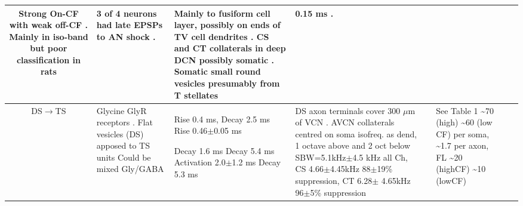 \begin{longtable}{cYYYYYYY}
Strong On-CF with weak off-CF  \citep[See fig 13][]{OstapoffBensonEtAl:1999}. 
Mainly in iso-band but poor classification in rats \citep{DoucetRossEtAl:1999,FriedlandPongstapornEtAl:2003}         
& %
3 of 4 neurons had late EPSPs to AN shock \citep[very young mice][]{ZhangOertel:1993}.
\citep{OstapoffBensonEtAl:1999} 

& %
Mainly to fusiform cell layer, possibly on ends of TV cell dendrites \citep[mouse][]{OertelWuEtAl:1990}. 
CS and CT collaterals in deep DCN possibly somatic \citep[guinea pig][]{PalmerWallaceEtAl:2003}.
Somatic small round vesicles presumably from T stellates  \citep[guinea pig][]{Alibardi:1999}   
& %
0.15 ms \citep[min EPSP latency to VCN Glutamate puffs, main excitation at 0.3 ms, AN shock produces late EPSPs about 3 msec][]{ZhangOertel:1993}.
\\ \midrule
DS\ensuremath{\rightarrow}TS                        
& %
Glycine GlyR receptors \citep[mouse][]{FerragamoGoldingEtAl:1998a}.
Flat vesicles (DS) apposed to TS units \citep[cat][]{SmithRhode:1989}     
Could be mixed Gly/GABA \citep{AltschulerJuizEtAl:1993} 
& %
Rise 0.4 ms, Decay 2.5 ms \citep[spontaneous IPSCs in rat MNTB neurons,][]{AwatramaniTurecekEtAl:2005}
Rise 0.46$\pm$0.05 ms \citep[spontaneous IPSCs in AVCN bushy cells, mouse][]{LimOleskevichEtAl:2003}


Decay 1.6 ms \citep[mouse VCN,]{Oertel:1983}
Decay 5.4 ms \citep{OertelWickesberg:1993,WickesbergOertel:1993}    
Activation 2.0$\pm$1.2 ms Decay 5.3 ms \citep[Gly puffs at 22$^\circ$C (Q$_{10}$ 2.1) in  guinea pig VCN,][]{HartyManis:1998}
& %
DS axon terminals cover 300 $\mu$m of VCN \citep[mouse][]{OertelWuEtAl:1990}.
AVCN collaterals centred on soma isofreq. as dend, 1 octave above and 2 oct below \citep[gerbil][]{ArnottWallaceEtAl:2004} 
SBW=5.1kHz$\pm$4.5 kHz all Ch, CS 4.66$\pm$4.45kHz 88$\pm$19\% suppression, CT 6.28$\pm$ 4.65kHz    96$\pm$5\% suppression \citep{RhodeGreenberg:1994b}
& %
 
& %
\citep[mice][]{FerragamoGoldingEtAl:1998a} 
See Table 1 \citep[cat][]{SmithRhode:1989} 
 \~{}70 (high) \~{}60 (low CF) per soma, \~{}1.7 per axon, FL \~{}20 (highCF)
               \~{}10 (lowCF) \citep[chinchilla][]{JosephsonMorest:1998}                


\end{longtable}
